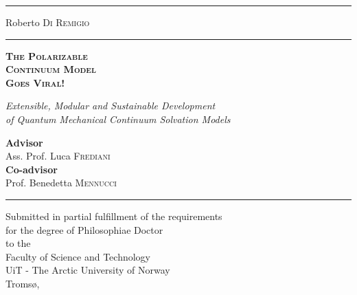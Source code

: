 
\newfontfamily{}
\begin{titlepage}
  \begingroup%
  \textheight
  \begin{minipage}[t]{0.05\textwidth}
    \color{brewerBlue}
    \rule{6pt}{\textheight}
  \end{minipage}
  \hspace{0.05\textwidth}
  \begin{minipage}[t]{0.8\textwidth}
    \vspace*{0.5\drop}
    {\LARGE Roberto \textsc{Di Remigio}} \\
    \rule{\textwidth}{1pt} \par
    \vspace{3\baselineskip}
    {\noindent\Cinzel\bfseries\scshape\Huge\color{brewerBlue}
    The Polarizable \\ Continuum Model \\ Goes Viral!} \par
    \vspace{2\baselineskip}
    {\Large\itshape Extensible, Modular and Sustainable Development
    \\
    of Quantum Mechanical Continuum Solvation Models} \par
    \vspace{6.5\baselineskip}
    {
    \large \textbf{Advisor}
    \\
    Ass. Prof. Luca \textsc{Frediani}
    \\[0.1\drop]
    \textbf{Co-advisor}
    \\
    Prof. Benedetta \textsc{Mennucci}
    } \par
    \vspace{\baselineskip}
    \rule{\textwidth}{1pt} \par
    {\small\itshape
    \begin{center}
      Submitted in partial fulfillment of the requirements
      \\
      for the degree of Philosophiae Doctor
      \\[0.1\drop]
      \textnormal{to the}
      \\[0.1\drop]
      Faculty of Science and Technology
      \\
      UiT - The Arctic University of Norway
      \\
      Tromsø, \myTime
    \end{center}
    }
  \end{minipage}
  \endgroup
\end{titlepage}
\restoregeometry
